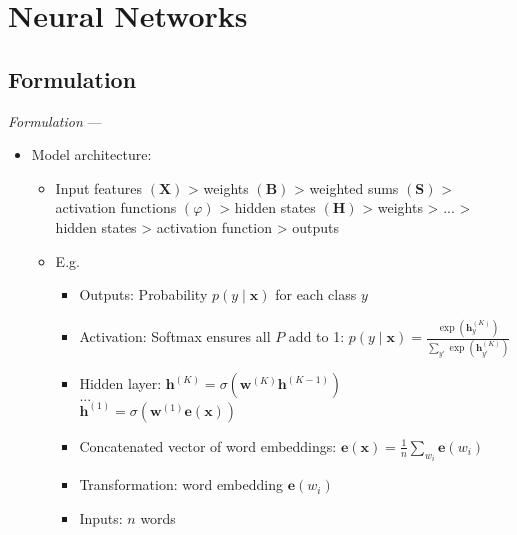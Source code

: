 \section{Neural Networks}
\subsection*{Formulation}
\emph{Formulation} --- 
\begin{itemize}
    \item Model architecture: 
    \begin{itemize}
        \item Input features $(\boldsymbol{X})$ > weights $(\boldsymbol{B})$ > weighted sums $(\boldsymbol{S})$ > activation functions $(\varphi)$ > hidden states $(\boldsymbol{H})$ > weights > ... > hidden states > activation function > outputs
        \item E.g.
        \begin{itemize}
            \item Outputs: Probability $p(y \mid \boldsymbol{x})$ for each class $y$
            \item Activation: Softmax ensures all $P$ add to 1:
            $
            p(y \mid \boldsymbol{x}) = \frac{\exp \left( \boldsymbol{h}_y^{(K)} \right)}{\sum_{y'} \exp \left( \boldsymbol{h}_{y'}^{(K)} \right)}
            $
            \item Hidden layer:
            $
            \boldsymbol{h}^{(K)} = \sigma(\boldsymbol{w}^{(K)}\boldsymbol{h}^{(K-1)})
            $\\
            $...$\\
            $
            \boldsymbol{h}^{(1)} = \sigma(\boldsymbol{w}^{(1)}\boldsymbol{e}(\boldsymbol{x}))
            $
            \item Concatenated vector of word embeddings:
            $
            \boldsymbol{e}(\boldsymbol{x}) = \frac{1}{n} \sum_{w_i} \boldsymbol{e}(w_i)
            $
            \item Transformation: word embedding $\boldsymbol{e}(w_i)$
            \item Inputs: $n$ words
        \end{itemize}
    \end{itemize}
\end{itemize}

